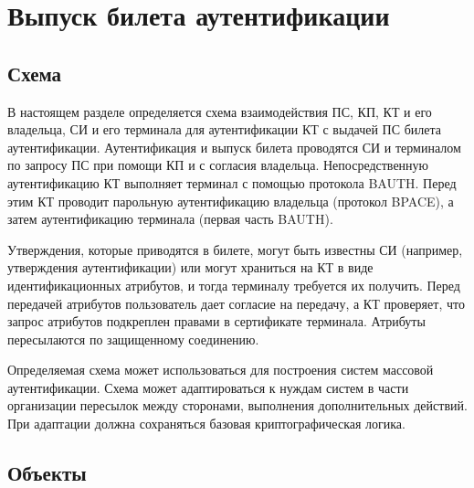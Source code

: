 \chapter{Выпуск билета аутентификации}\label{FLOW}

\section{Схема}\label{FLOW.Common}

В настоящем разделе определяется схема взаимодействия ПС, КП, КТ и его
владельца, СИ и его терминала для аутентификации КТ с выдачей ПС билета
аутентификации.
%
Аутентификация и выпуск билета проводятся СИ и терминалом по запросу ПС при 
помощи КП и с согласия владельца.
%
Непосредственную аутентификацию КТ выполняет терминал с помощью протокола BAUTH.
Перед этим КТ проводит парольную аутентификацию владельца (протокол BPACE), а
затем аутентификацию терминала (первая часть BAUTH).

Утверждения, которые приводятся в билете, могут быть известны СИ
(например, утверждения аутентификации) или могут храниться на КТ в виде 
идентификационных атрибутов, и тогда терминалу требуется их получить.
%
Перед передачей атрибутов пользователь дает согласие на передачу, а КТ 
проверяет, что запрос атрибутов подкреплен правами в сертификате 
терминала. Атрибуты пересылаются по защищенному соединению.

Определяемая схема может использоваться для построения систем массовой 
аутентификации. Схема может адаптироваться к нуждам систем в части 
организации пересылок между сторонами, выполнения дополнительных действий. 
При адаптации должна сохраняться базовая криптографическая логика.

\section{Объекты}

